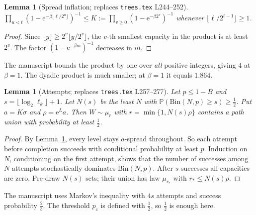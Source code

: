\documentclass[11pt]{amsart}
\newtheorem{lemma}[theorem]{Lemma}
\theoremstyle{remark}
\newcommand{\PP}{\mathbb P}
\newcommand{\pc}{p_{\mathrm c}}
\newcommand{\ee}{\mathrm e}
\begin{document}
\begin{lemma}[Spread inflation; replaces \texttt{trees.tex} L244--252]\label{lem:K}
$\prod_{u<t}(1-\ee^{-\beta\lfloor\ell/2^u\rfloor})^{-1}\le K:=\prod_{v\ge0}(1-\ee^{-\beta2^v})^{-1}$
whenever $\lfloor\ell/2^{t-1}\rfloor\ge1$.
\end{lemma}
\begin{proof}
Since $\lfloor y\rfloor\ge2^v\lfloor y/2^v\rfloor$, the $v$-th smallest
capacity in the product is at least $2^v$. The factor
$(1-\ee^{-\beta m})^{-1}$ decreases in $m$.
\end{proof}

The manuscript bounds the product by one over \emph{all} positive integers,
giving $4$ at $\beta=1$. The dyadic product is much smaller; at $\beta=1$ it
equals $1.864$.

\begin{lemma}[Attempts; replaces \texttt{trees.tex} L257--277]\label{lem:att}
Let $p\le1-B$ and $s=\lfloor\log_2\ell_k\rfloor+1$. Let $N(s)$ be the least $N$ with
$\PP(\mathrm{Bin}(N,p)\ge s)\ge\frac12$. Put $a=K\sigma$ and $\rho=\ee^La$.
Then $W\sim\mu_r$ with $r=\min\{1,N(s)\rho\}$ contains a path union with
probability at least $\frac12$.
\end{lemma}
\begin{proof}
By Lemma~\ref{lem:K}, every level stays $a$-spread throughout. So each attempt
before completion succeeds with conditional probability at least $p$.
Induction on $N$, conditioning on the first attempt, shows that the number
of successes among $N$ attempts stochastically dominates $\mathrm{Bin}(N,p)$.
After $s$ successes all capacities are zero. Pre-draw $N(s)$ sets; their union
has law $\mu_{r_*}$ with $r_*\le N(s)\rho$.
\end{proof}

The manuscript uses Markov's inequality with $4s$ attempts and success
probability $\frac23$. The threshold $\pc$ is defined with $\frac12$, so
$\frac12$ is enough here.
\end{document}
